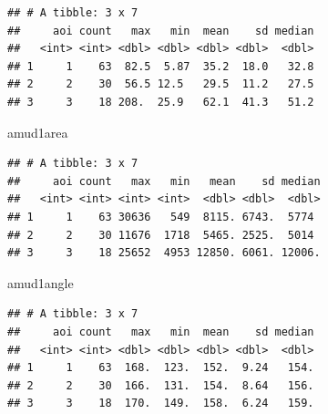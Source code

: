 \documentclass[
]{article}
\newenvironment{Shaded}{\begin{snugshade}}{\end{snugshade}}
\newcommand{\NormalTok}[1]{#1}
\begin{document}
\begin{verbatim}
## # A tibble: 3 x 7
##     aoi count   max   min  mean    sd median
##   <int> <int> <dbl> <dbl> <dbl> <dbl>  <dbl>
## 1     1    63  82.5  5.87  35.2  18.0   32.8
## 2     2    30  56.5 12.5   29.5  11.2   27.5
## 3     3    18 208.  25.9   62.1  41.3   51.2
\end{verbatim}

\begin{Shaded}
\begin{Highlighting}[]
\NormalTok{amud1area}
\end{Highlighting}
\end{Shaded}

\begin{verbatim}
## # A tibble: 3 x 7
##     aoi count   max   min   mean    sd median
##   <int> <int> <int> <int>  <dbl> <dbl>  <dbl>
## 1     1    63 30636   549  8115. 6743.  5774 
## 2     2    30 11676  1718  5465. 2525.  5014 
## 3     3    18 25652  4953 12850. 6061. 12006.
\end{verbatim}

\begin{Shaded}
\begin{Highlighting}[]
\NormalTok{amud1angle}
\end{Highlighting}
\end{Shaded}

\begin{verbatim}
## # A tibble: 3 x 7
##     aoi count   max   min  mean    sd median
##   <int> <int> <dbl> <dbl> <dbl> <dbl>  <dbl>
## 1     1    63  168.  123.  152.  9.24   154.
## 2     2    30  166.  131.  154.  8.64   156.
## 3     3    18  170.  149.  158.  6.24   159.
\end{verbatim}
\end{document}
